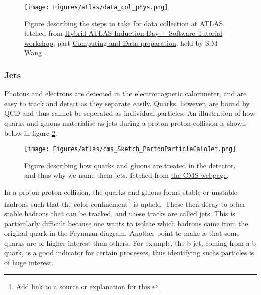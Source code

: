 \begin{figure}[H]
    \texttt{[image: Figures/atlas/data\_col\_phys.png]}
    \caption[Steps from data collection to physics results]{Figure describing the steps to take for data collection at ATLAS, fetched from \href{https://indico.cern.ch/event/1159574/timetable/?view=standard}{Hybrid ATLAS Induction Day + Software Tutorial workshop}, part
    \href{https://indico.cern.ch/event/860971/contributions/3672974/attachments/1972049/3280896/Atlas_computing_data_preparation_jan20.pdf}{Computing and Data preparation}, 
    held by S.M Wang \cite{Wang:2707056} . }
    \label{fig:atlas_data_col_phys}
\end{figure}


\subsubsection*{Jets}
Photons and electrons are detected in the electromagnetic calorimeter, and are easy to track and detect as they 
separate easily. Quarks, however, are bound by QCD and thus cannot be seperated as individual 
particles. An illustration of how quarks and gluons materialise as jets during a proton-proton 
collision is shown below in figure \ref{fig:cms_jets}.

\begin{figure}[H]
    \texttt{[image: Figures/atlas/cms\_Sketch\_PartonParticleCaloJet.png]}
    \caption[Jet produciton from pp-collisions to detector]{Figure describing how quarks and gluons are treated in the detector, and thus why we name them jets, fetched from \href{https://cms.cern/sites/default/files/field/image/Sketch_PartonParticleCaloJet.png}{the CMS webpage}. }
    \label{fig:cms_jets}
\end{figure}

In a proton-proton collision, the quarks and gluons forms stable or unstable hadrons such that the color confinement\footnote{Add link to a source or explanation for this.} is upheld. These then 
decay to other stable hadrons that can be tracked, and these tracks are called jets. This is particularly difficult because one wants to isolate which hadrons came from  the original quark in the 
Feynman diagram. Another point to make is that some quarks are of higher interest than others. For example, the b jet, coming from a b quark, is a good indicator for certain processes, 
thus identifying suchs particles is of huge interest. 